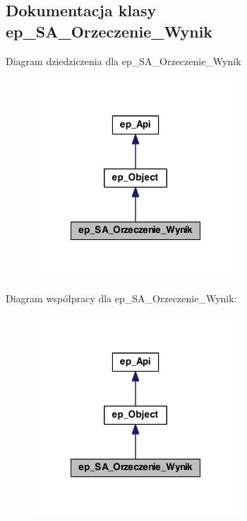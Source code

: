 \hypertarget{classep___s_a___orzeczenie___wynik}{\subsection{Dokumentacja klasy ep\-\_\-\-S\-A\-\_\-\-Orzeczenie\-\_\-\-Wynik}
\label{classep___s_a___orzeczenie___wynik}
}


Diagram dziedziczenia dla ep\-\_\-\-S\-A\-\_\-\-Orzeczenie\-\_\-\-Wynik\nopagebreak
\begin{figure}[H]
\begin{center}
\leavevmode
\includegraphics[width=216pt]{classep___s_a___orzeczenie___wynik__inherit__graph}
\end{center}
\end{figure}


Diagram współpracy dla ep\-\_\-\-S\-A\-\_\-\-Orzeczenie\-\_\-\-Wynik\-:\nopagebreak
\begin{figure}[H]
\begin{center}
\leavevmode
\includegraphics[width=216pt]{classep___s_a___orzeczenie___wynik__coll__graph}
\end{center}
\end{figure}
